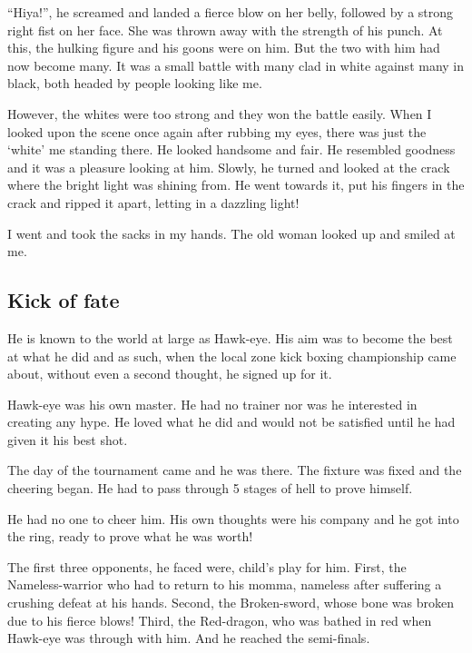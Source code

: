 \documentclass[twoside,11pt,titlepage]{article}
\begin{document}
``Hiya!'', he screamed and landed a fierce blow on her belly, followed by a strong right fist on her face. She was thrown away with the strength of his punch. At this, the hulking figure and his goons were on him. But the two with him had now become many. It was a small battle with many clad in white against many in black, both headed by people looking like me.

However, the whites were too strong and they won the battle easily. When I looked upon the scene once again after rubbing my eyes, there was just the `white' me standing there. He looked handsome and fair. He resembled goodness and it was a pleasure looking at him. Slowly, he turned and looked at the crack where the bright light was shining from. He went towards it, put his fingers in the crack and ripped it apart, letting in a dazzling light!

I went and took the sacks in my hands. The old woman looked up and smiled at me.
\newpage

\begin{center}
  \section{Kick of fate}
\end{center}
\bigskip
\bigskip
\bigskip

He is known to the world at large as Hawk-eye. His aim was to become the best at what he did and as such, when the local zone kick boxing championship came about, without even a second thought, he signed up for it.

Hawk-eye was his own master. He had no trainer nor was he interested in creating any hype. He loved what he did and would not be satisfied until he had given it his best shot.

The day of the tournament came and he was there. The fixture was fixed and the cheering began. He had to pass through 5 stages of hell to prove himself.

He had no one to cheer him. His own thoughts were his company and he got into the ring, ready to prove what he was worth!

The first three opponents, he faced were, child's play for him. First, the Nameless-warrior who had to return to his momma, nameless after suffering a crushing defeat at his hands. Second, the Broken-sword, whose bone was broken due to his fierce blows! Third, the Red-dragon, who was bathed in red when Hawk-eye was through with him. And he reached the semi-finals.
\end{document}
